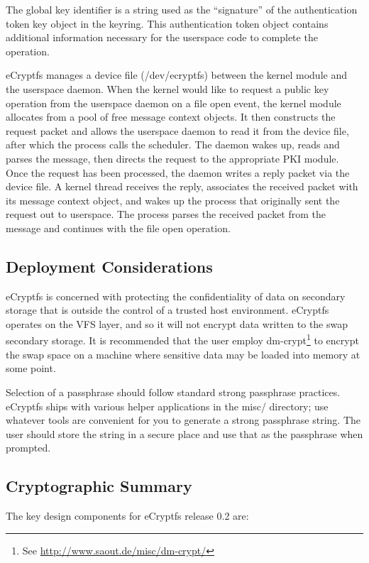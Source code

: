 \documentclass{article}
\begin{document}
The global key identifier is a string used as the ``signature'' of the
authentication token key object in the keyring. This authentication
token object contains additional information necessary for the
userspace code to complete the operation.

eCryptfs manages a device file (/dev/ecryptfs) between the kernel module
and the userspace daemon. When the kernel would like to request a public
key operation from the userspace daemon on a file open event, the kernel
module allocates from a pool of free message context objects. It then
constructs the request packet and allows the userspace daemon to read it
from the device file, after which the process calls the scheduler. The
daemon wakes up, reads and parses the message, then directs the request
to the appropriate PKI module. Once the request has been processed, the
daemon writes a reply packet via the device file. A kernel thread
receives the reply, associates the received packet with its message
context object, and wakes up the process that originally sent the
request out to userspace. The process parses the received packet from
the message and continues with the file open operation.

\subsection{Deployment Considerations}

eCryptfs is concerned with protecting the confidentiality of data on
secondary storage that is outside the control of a trusted host
environment. eCryptfs operates on the VFS layer, and so it will not
encrypt data written to the swap secondary storage. It is recommended
that the user employ dm-crypt\footnote{See
\url{http://www.saout.de/misc/dm-crypt/}} to encrypt the swap space on
a machine where sensitive data may be loaded into memory at some
point.

Selection of a passphrase should follow standard strong passphrase
practices. eCryptfs ships with various helper applications in the
misc/ directory; use whatever tools are convenient for you to generate
a strong passphrase string. The user should store the string in a
secure place and use that as the passphrase when prompted.

\subsection{Cryptographic Summary}

The key design components for eCryptfs release 0.2 are:
\end{document}
